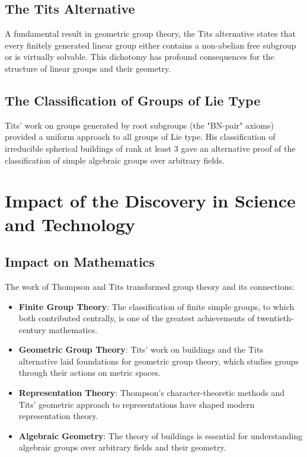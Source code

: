 \subsection{The Tits Alternative}

A fundamental result in geometric group theory, the Tits alternative states that every finitely generated linear group either contains a non-abelian free subgroup or is virtually solvable. This dichotomy has profound consequences for the structure of linear groups and their geometry.

\subsection{The Classification of Groups of Lie Type}

Tits' work on groups generated by root subgroups (the "BN-pair" axioms) provided a uniform approach to all groups of Lie type. His classification of irreducible spherical buildings of rank at least 3 gave an alternative proof of the classification of simple algebraic groups over arbitrary fields.

\section{Impact of the Discovery in Science and Technology}

\subsection{Impact on Mathematics}

The work of Thompson and Tits transformed group theory and its connections:

\begin{itemize}
\item \textbf{Finite Group Theory}: The classification of finite simple groups, to which both contributed centrally, is one of the greatest achievements of twentieth-century mathematics.

\item \textbf{Geometric Group Theory}: Tits' work on buildings and the Tits alternative laid foundations for geometric group theory, which studies groups through their actions on metric spaces.

\item \textbf{Representation Theory}: Thompson's character-theoretic methods and Tits' geometric approach to representations have shaped modern representation theory.

\item \textbf{Algebraic Geometry}: The theory of buildings is essential for understanding algebraic groups over arbitrary fields and their geometry.
\end{itemize}

